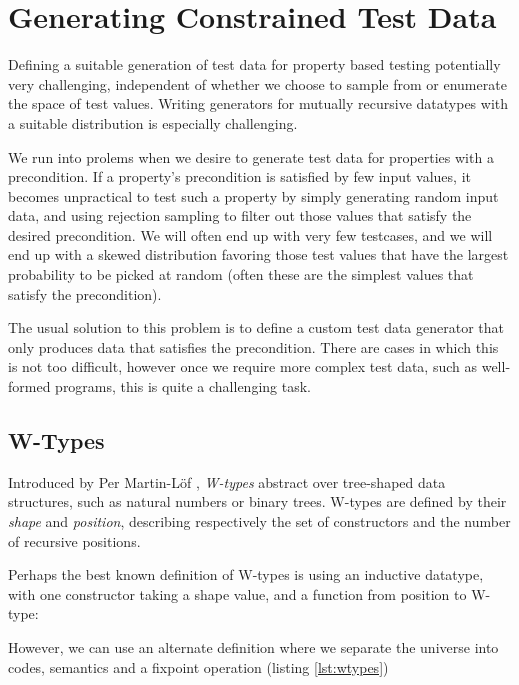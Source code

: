 \documentclass[a4paper,msc,twosized=semi]{uustthesis}
\newcommand{\includeagda}[2]{\vspace*{-0.35cm}\begin{center}\ExecuteMetaData[../src/chap0#1/latex/code.tex]{#2}\end{center}\vspace*{-0.35cm}}
\begin{document}
\section{Generating Constrained Test Data}\label{genconstrainedtd}

  Defining a suitable generation of test data for property based testing potentially very challenging, independent of whether we choose to sample from 
  or enumerate the space of test values. Writing generators for mutually recursive 
  datatypes with a suitable distribution is especially challenging. 
    
  We run into prolems when we desire to generate test data for properties with a 
  precondition. If a property's precondition is satisfied by few input values, it 
  becomes unpractical to test such a property by simply generating random input data, 
  and using rejection sampling to filter out those values that satisfy the desired 
  precondition. We will often end up with very few testcases, and we will end up with 
  a skewed distribution favoring those test values that have the largest probability 
  to be picked at random (often these are the simplest values that satisfy the 
  precondition). 
  
  The usual solution to this problem is to define a custom test data generator that 
  only produces data that satisfies the precondition. There are cases in which this is 
  not too difficult, however once we require more complex test data, such as 
  well-formed programs, this is quite a challenging task. 

\subsection{W-Types}\label{sec:wtypes}

  Introduced by Per Martin-Löf \cite{martin1984intuitionistic}, \emph{W-types} 
  abstract over tree-shaped data structures, such as natural numbers or binary trees. 
  W-types are defined by their \emph{shape} and \emph{position}, describing 
  respectively the set of constructors and the number of recursive positions. 

  Perhaps the best known definition of W-types is using an inductive datatype, with 
  one constructor taking a shape value, and a function from position to W-type: 

\includeagda{3}{winductive}

  However, we can use an alternate definition where we separate the universe into 
  codes, semantics and a fixpoint operation (listing \ref{lst:wtypes})
\end{document}
